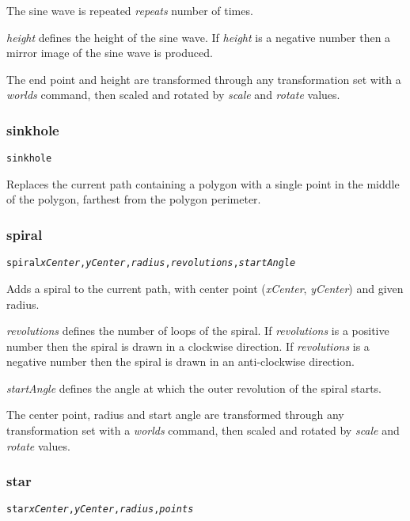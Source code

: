 The sine wave is repeated \textit{repeats} number of times.

\textit{height} defines the height of the sine wave.
If \textit{height} is a negative number then a mirror image
of the sine wave is produced.

The end point and height are transformed through any
transformation set with a \textit{worlds} command,
then scaled and rotated by \textit{scale}
and \textit{rotate} values.

\subsubsection{sinkhole}

\begin{alltt}
sinkhole
\end{alltt}

Replaces the current path containing a polygon with a single point in the
middle of the polygon, farthest from the polygon perimeter.

\subsubsection{spiral}

\begin{alltt}
spiral \textit{xCenter}, \textit{yCenter}, \textit{radius}, \textit{revolutions}, \textit{startAngle}
\end{alltt}

Adds a spiral to the current path, with center
point (\textit{xCenter}, \textit{yCenter}) and given radius.

\textit{revolutions} defines the number of loops of the spiral.
If \textit{revolutions}
is a positive number then the spiral is drawn in a clockwise direction.
If \textit{revolutions} is a negative number then the spiral
is drawn in an anti-clockwise direction.

\textit{startAngle} defines the
angle at which the outer revolution of the spiral starts.

The center point, radius and start angle are transformed through any
transformation set with a \textit{worlds} command,
then scaled and rotated by \textit{scale}
and \textit{rotate} values.

\subsubsection{star}

\begin{alltt}
star \textit{xCenter}, \textit{yCenter}, \textit{radius}, \textit{points}
\end{alltt}

